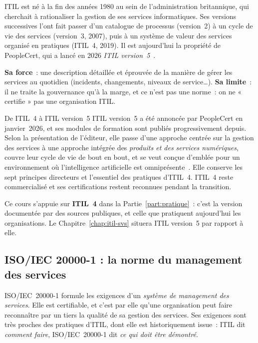 ITIL est né à la fin des années 1980 au sein de l'administration
britannique, qui cherchait à rationaliser la gestion de ses services
informatiques. Ses versions successives l'ont fait passer d'un catalogue
de processus (version~2) à un cycle de vie des services (version~3, 2007),
puis à un système de valeur des services organisé en pratiques
(ITIL~4, 2019). Il est aujourd'hui la propriété de PeopleCert, qui a
lancé en 2026 \emph{ITIL version~5}~\cite{peoplecert2026itil5}.

\textbf{Sa force}~: une description détaillée et éprouvée de la manière de
gérer les services au quotidien (incidents, changements, niveaux de
service\ldots). \textbf{Sa limite}~: il ne traite la gouvernance qu'à la
marge, et ce n'est pas une norme~: on ne « certifie » pas une organisation
ITIL.

\begin{boiteRemarque}{De ITIL~4 à ITIL version~5}
ITIL version~5 a été annoncée par PeopleCert en janvier~2026, et ses
modules de formation sont publiés progressivement depuis. Selon la
présentation de l'éditeur, elle passe d'une approche centrée sur la
gestion des services à une approche intégrée des \emph{produits et des
services numériques}, couvre leur cycle de vie de bout en bout, et se
veut conçue d'emblée pour un environnement où l'intelligence artificielle
est omniprésente~\cite{peoplecert2026itil5}. Elle conserve les sept
principes directeurs et l'essentiel des pratiques d'ITIL~4. ITIL~4 reste
commercialisé et ses certifications restent reconnues pendant la
transition.

\smallskip
Ce cours s'appuie sur \textbf{ITIL~4} dans la Partie~\ref{part:pratique}~:
c'est la version documentée par des sources publiques, et celle que
pratiquent aujourd'hui les organisations. Le Chapitre~\ref{chap:itil-svs}
situera ITIL version~5 par rapport à elle.
\end{boiteRemarque}

\subsection{ISO/IEC 20000-1 : la norme du management des services}

ISO/IEC~20000-1 formule les exigences d'un \emph{système de management des
services}. Elle est certifiable, et c'est par elle qu'une organisation
peut faire reconnaître par un tiers la qualité de sa gestion des services.
Ses exigences sont très proches des pratiques d'ITIL, dont elle est
historiquement issue~: ITIL dit \emph{comment faire}, ISO/IEC~20000-1 dit
\emph{ce qui doit être démontré}.

